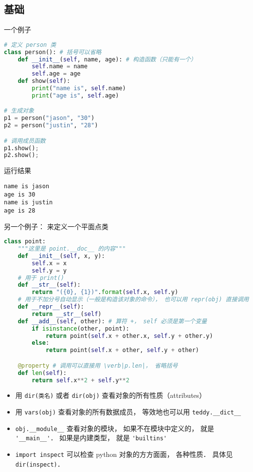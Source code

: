 
\begin{issues}
\issueDraft
\end{issues}


\subsection{基础}
一个例子
\begin{lstlisting}[language=python]
# 定义 person 类
class person(): # 括号可以省略
    def __init__(self, name, age): # 构造函数（只能有一个）
        self.name = name 
        self.age = age 
    def show(self): 
        print("name is", self.name)
        print("age is", self.age)

# 生成对象
p1 = person("jason", "30") 
p2 = person("justin", "28")

# 调用成员函数
p1.show();
p2.show();
\end{lstlisting}
运行结果
\begin{lstlisting}[language=none]
name is jason
age is 30
name is justin
age is 28
\end{lstlisting}

另一个例子： 来定义一个平面点类
\begin{lstlisting}[language=python]
class point:
    """这里是 point.__doc__ 的内容"""
    def __init__(self, x, y): 
        self.x = x
        self.y = y
    # 用于 print()
    def __str__(self):
        return "({0}, {1})".format(self.x, self.y)
    # 用于不加分号自动显示（一般是构造该对象的命令）， 也可以用 repr(obj) 直接调用
    def __repr__(self):
        return __str__(self)
    def __add__(self, other): # 算符 +， self 必须是第一个变量
        if isinstance(other, point):
            return point(self.x + other.x, self.y + other.y)
        else:
            return point(self.x + other, self.y + other)

    @property # 调用可以直接用 \verb|p.len|， 省略括号
    def len(self):
        return self.x**2 + self.y**2
\end{lstlisting}

\begin{itemize}
\item 用 \verb|dir(类名)| 或者 \verb|dir(obj)| 查看对象的所有性质（attributes）
\item 用 \verb|vars(obj)| 查看对象的所有数据成员， 等效地也可以用 \verb|teddy.__dict__|
\item \verb|obj.__module__| 查看对象的模块， 如果不在模块中定义的， 就是 \verb|'__main__'|． 如果是内建类型， 就是 \verb|'builtins'|
\item \verb|import inspect| 可以检查 python 对象的方方面面， 各种性质． 具体见 \verb|dir(inspect)|．
\end{itemize}

